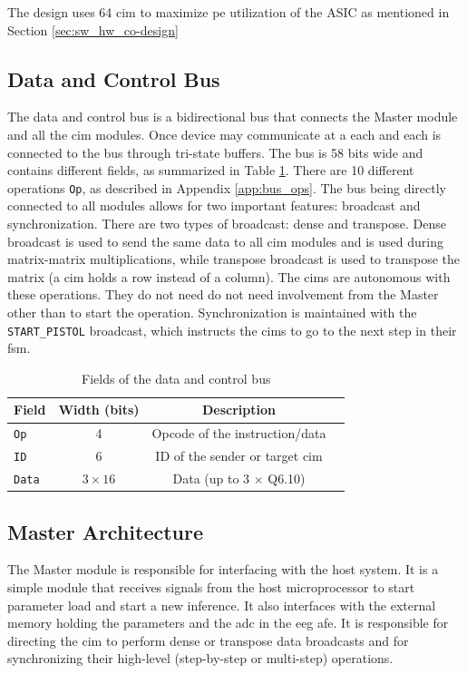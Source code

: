 The design uses 64 \ac{cim} to maximize \ac{pe} utilization of the ASIC as mentioned in Section \ref{sec:sw_hw_co-design}

\subsection{Data and Control Bus}
The data and control bus is a bidirectional bus that connects the Master module and all the \ac{cim} modules. Once device may communicate at a each and each is connected to the bus
through tri-state buffers. The bus is 58 bits wide and contains different fields, as summarized in Table \ref{tab:bus_fields}. There are 10 different operations \texttt{Op}, as
described in Appendix \ref{app:bus_ops}. The bus being directly connected to all modules allows for two important features: broadcast and synchronization. There are two types of
broadcast: dense and transpose. Dense broadcast is used to send the same data to all \ac{cim} modules and is used during matrix-matrix multiplications, while transpose broadcast is
used to transpose the matrix (a \ac{cim} holds a row instead of a column). The \ac{cim}s are autonomous with these operations. They do not need do not need involvement from the Master
other than to start the operation. Synchronization is maintained with the \texttt{START\_PISTOL} broadcast, which instructs the \ac{cim}s to go to the next step in their \ac{fsm}.

\begin{table}[ht]
    \centering
    \renewcommand{\arraystretch}{1.2} %
    \setlength{\arrayrulewidth}{1.5pt} %
    \caption{Fields of the data and control bus}
    \begin{tabular}{@{} p{1cm}ccc @{}}
        \toprule
        Field           & Width (bits)  & Description \\\midrule
        \texttt{Op}     & 4             & Opcode of the instruction/data \\
        \texttt{ID}     & 6             & ID of the sender or target \ac{cim} \\
        \texttt{Data}   & $3\times16$   & Data (up to 3 $\times$ Q6.10) \\
        \bottomrule
    \end{tabular}
    \label{tab:bus_fields}
\end{table}

\subsection{Master Architecture}
The Master module is responsible for interfacing with the host system. It is a simple module that receives signals from the host microprocessor to start parameter load and
start a new inference. It also interfaces with the external memory holding the parameters and the \ac{adc} in the \ac{eeg} \ac{afe}. It is responsible for directing the \ac{cim}
to perform dense or transpose data broadcasts and for synchronizing their high-level (step-by-step or multi-step) operations.

